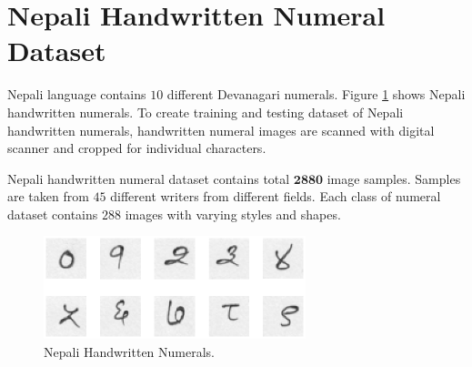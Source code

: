 \section{Nepali Handwritten Numeral Dataset}
\label{section_numeral_dataset}

Nepali language contains $10$ different Devanagari numerals. Figure \ref{figure_one_two} shows Nepali handwritten numerals. To create training and testing dataset of Nepali handwritten numerals, handwritten numeral images are scanned with digital scanner and cropped for individual characters.

Nepali handwritten numeral dataset contains total $\textbf{2880}$ image samples. Samples are taken from $45$ different writers from different fields. Each class of numeral dataset contains $288$ images with varying styles and shapes.
\begin{figure}[h]
\centering
\includegraphics[width=3in]{figures/datasets/nhcr/one_two_sample.eps}
\caption{Nepali Handwritten Numerals.}
\label{figure_one_two}
\end{figure}